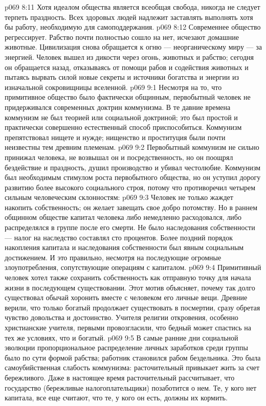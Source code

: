 \vs p069 8:11 Хотя идеалом общества является всеобщая свобода, никогда не следует терпеть праздность. Всех здоровых людей надлежит заставлять выполнять хотя бы работу, необходимую для самоподдержания.
\vs p069 8:12 Современнее общество регрессирует. Рабство почти полностью сошло на нет, исчезают домашние животные. Цивилизация снова обращается к огню --- неорганическому миру --- за энергией. Человек вышел из дикости через огонь, животных и рабство; сегодня он обращается назад, отказываясь от помощи рабов и содействия животных и пытаясь вырвать силой новые секреты и источники богатства и энергии из изначальной сокровищницы вселенной.
\vs p069 9:1 Несмотря на то, что примитивное общество было фактически общинным, первобытный человек не придерживался современных доктрин коммунизма. В те давние времена коммунизм не был теорией или социальной доктриной; это был простой и практически совершенно естественный способ приспособиться. Коммунизм препятствовал нищете и нужде; нищенство и проституция были почти неизвестны тем древним племенам.
\vs p069 9:2 \pc Первобытный коммунизм не сильно принижал человека, не возвышал он и посредственность, но он поощрял бездействие и праздность, душил производство и убивал честолюбие. Коммунизм был необходимым стимулом роста первобытного общества, но он уступил дорогу развитию более высокого социального строя, потому что противоречил четырем сильным человеческим склонностям:
\vs p069 9:3 \bibnobreakspace {} Человек не только жаждет накопить собственность; он желает завещать свое добро потомству. Но в раннем общинном обществе капитал человека либо немедленно расходовался, либо распределялся в группе после его смерти. Не было наследования собственности --- налог на наследство составлял сто процентов. Более поздний порядок накопления капитала и наследования собственности был явным социальным достижением. И это правильно, несмотря на последующие огромные злоупотребления, сопутствующие операциям с капиталом.
\vs p069 9:4 \bibnobreakspace {} Примитивный человек хотел также сохранить собственность как отправную точку для начала жизни в последующем существовании. Этот мотив объясняет, почему так долго существовал обычай хоронить вместе с человеком его личные вещи. Древние верили, что только богатый продолжает существовать в посмертии, сразу обретая чувство довольства и достоинство. Учителя религии откровения, особенно христианские учителя, первыми провозгласили, что бедный может спастись на тех же условиях, что и богатый.
\vs p069 9:5 \bibnobreakspace {} В самые ранние дни социальной эволюции пропорциональное распределение личных заработков среди группы было по сути формой рабства; работник становился рабом бездельника. Это была самоубийственная слабость коммунизма: расточительный привыкает жить за счет бережливого. Даже в настоящее время расточительный рассчитывает, что государство (бережливые налогоплательщики) позаботится о нем. Те, у кого нет капитала, все еще считают, что те, у кого он есть, должны их кормить.
